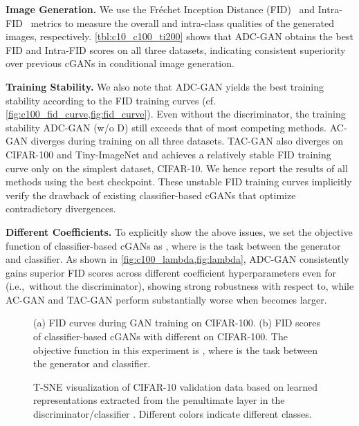 \documentclass[nohyperref]{article}
\theoremstyle{plain}
\theoremstyle{definition}
\theoremstyle{remark}
\begin{document}
\textbf{Image Generation.} We use the Fr\'{e}chet Inception Distance (FID)~\cite{NIPS2017_8a1d6947} and Intra-FID~\cite{miyato2018cgans} metrics to measure the overall and intra-class qualities of the generated images, respectively.
\cref{tbl:c10_c100_ti200} shows that ADC-GAN obtains the best FID and Intra-FID scores on all three datasets, indicating consistent superiority over previous cGANs in conditional image generation.

\textbf{Training Stability.} We also note that ADC-GAN yields the best training stability according to the FID training curves (cf. \cref{fig:c100_fid_curve,fig:fid_curve}).
Even without the discriminator, the training stability ADC-GAN (w/o D) still exceeds that of most competing methods.
AC-GAN diverges during training on all three datasets.
TAC-GAN also diverges on CIFAR-100 and Tiny-ImageNet and achieves a relatively stable FID training curve only on the simplest dataset, CIFAR-10.
We hence report the results of all methods using the best checkpoint.
These unstable FID training curves implicitly verify the drawback of existing classifier-based cGANs that optimize contradictory divergences.

\textbf{Different Coefficients.} To explicitly show the above issues, we set the objective function of classifier-based cGANs as , where  is the task between the generator and classifier.
As shown in \cref{fig:c100_lambda,fig:lambda}, ADC-GAN consistently gains superior FID scores across different coefficient hyperparameters even for  (i.e.,~without the discriminator), showing strong robustness with respect to, while AC-GAN and TAC-GAN perform substantially worse when  becomes larger.

\begin{figure}[t]
\begin{center}
\caption{(a) FID curves during GAN training on CIFAR-100. (b) FID scores of classifier-based cGANs with different  on CIFAR-100. The objective function in this experiment is , where  is the task between the generator and classifier.}
\label{fig:c100}
\end{center}
\end{figure}

\begin{figure}[t]
\begin{center}
\caption{T-SNE visualization of CIFAR-10 validation data based on learned representations extracted from the penultimate layer in the discriminator/classifier . Different colors indicate different classes.}
\label{fig:tsne}
\end{center}
\end{figure}
\end{document}
